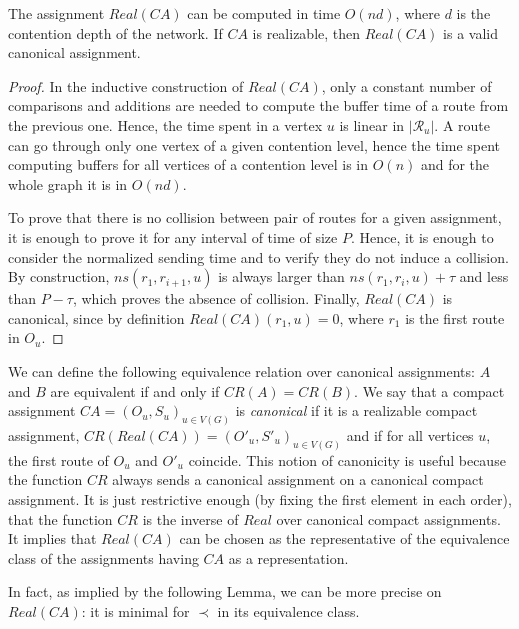 \documentclass[english]{article}
\begin{document}
\begin{lemma}\label{lemma:canonical}
The assignment $Real(CA)$ can be computed in time $O(nd)$, where $d$ is the contention
depth of the network. If $CA$ is realizable, then $Real(CA)$ is a valid canonical assignment.
\end{lemma}
\begin{proof}
In the inductive construction of $Real(CA)$,  only a constant number of comparisons and additions are needed to compute the 
buffer time of a route from the previous one. Hence, the time spent in a vertex $u$ is linear in $|\mathcal{R}_u|$. 
A route can go through only one vertex of a given contention level, hence the time spent computing buffers for all vertices
of a contention level is in $O(n)$ and for the whole graph it is in $O(nd)$.

To prove that there is no collision between pair of routes for a given assignment, it is enough to 
prove it for any interval of time of size $P$. Hence, it is enough to consider the normalized sending time and to verify
they do not induce a collision. By construction,  $ns(r_1,r_{i+1},u)$ is always larger than $ns(r_1,r_{i},u) + \tau$ and less 
than $P - \tau$, which proves the absence of collision. Finally, $Real(CA)$ is canonical, since by definition $Real(CA)(r_1,u) = 0$,
where $r_1$ is the first route in $O_u$.
\end{proof}

We can define the following equivalence relation over canonical assignments: $A$ and $B$ are equivalent if and only if $CR(A) = CR(B)$.
We say that a compact assignment $CA = (O_u,S_u)_{u \in V(G)}$ is \emph{canonical} if it is a realizable compact assignment, $CR(Real(CA)) = (O'_u,S'_u)_{u \in V(G)}$ and if for all vertices $u$, the first route of $O_u$ and $O'_u$ coincide. This notion of canonicity is useful because the function 
$CR$ always sends a canonical assignment on a canonical compact assignment. It is just restrictive enough (by fixing the first element in each order),
that the function $CR$ is the inverse of $Real$ over canonical compact assignments. It implies that
$Real(CA)$ can be chosen as the representative of the equivalence class of the assignments having $CA$ as a representation.

In fact, as implied by the following Lemma, we can be more precise on $Real(CA)$: it is minimal for $\prec$ in its equivalence class.
\end{document}
